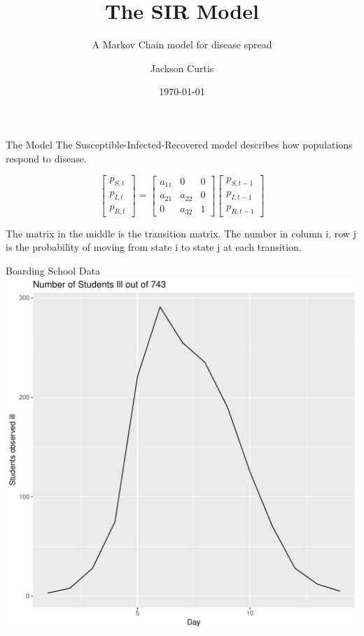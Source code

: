 \documentclass[10pt,table]{beamer}
\title{The SIR Model}
\subtitle{A Markov Chain model for disease spread}
\date{\today}
\author{Jackson Curtis}
\institute{Brigham Young University}
\begin{document}
\maketitle

\begin{frame}[fragile]{The Model}
The Susceptible-Infected-Recovered model describes how populations respond to disease.

$$\begin{bmatrix}
    p_{S,t}       \\
    p_{I,t}      \\

    p_{R,t}     
\end{bmatrix}
=
\begin{bmatrix}
a_{11} & 0 & 0 \\
a_{21} & a_{22} & 0 \\
0 & a_{32} & 1
\end{bmatrix}
\begin{bmatrix}
    p_{S,t-1}       \\
    p_{I,t-1}      \\

    p_{R,t-1}     
\end{bmatrix}
\label{sdf}
$$

The matrix in the middle is the transition matrix. The number in column i, row j is the probability of moving from state i to state j at each transition.
\end{frame}

\begin{frame}[fragile]{Boarding School Data}
\centering
\includegraphics[scale=.45]{BoardingData.pdf}

\end{frame}
\end{document}
